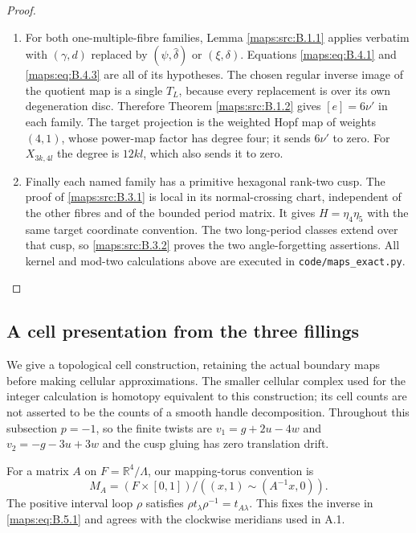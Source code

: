 \begin{proof}
\begin{enumerate}[label=\arabic*.,leftmargin=*]
\item For both one-multiple-fibre families,
Lemma \ref{maps:src:B.1.1} applies verbatim with
$(\gamma,d)$ replaced by $(\psi,\widehat\delta)$
or $(\xi,\delta)$.  Equations \eqref{maps:eq:B.4.1}
and \eqref{maps:eq:B.4.3} are all of its hypotheses.
The chosen regular inverse image of
the quotient map is a single $T_L$,
because every replacement is over its
own degeneration disc.  Therefore
Theorem \ref{maps:src:B.1.2} gives $[e]=6\nu'$ in
each family.  The target projection
is the weighted Hopf map of weights
$(4,1)$, whose power-map factor has
degree four; it sends $6\nu'$ to zero.
For $X_{3k,4l}$ the degree is $12kl$,
which also sends it to zero.

\item Finally each named family has a
primitive hexagonal rank-two cusp.
The proof of \ref{maps:src:B.3.1} is local in its
normal-crossing chart, independent
of the other fibres and of the
bounded period matrix.  It gives
$H=\eta_4\eta_5$ with the same target
coordinate convention.  The two
long-period classes extend over
that cusp, so \ref{maps:src:B.3.2} proves the
two angle-forgetting assertions.
All kernel and mod-two calculations
above are executed in
\texttt{code/maps\_exact.py}.
\end{enumerate}
\end{proof}

\subsection{A cell presentation from the three fillings}

We give a topological cell construction, retaining the actual
boundary maps before making cellular approximations.  The
smaller cellular complex used for the integer calculation is
homotopy equivalent to this construction; its cell counts are
not asserted to be the counts of a smooth handle decomposition.
Throughout this subsection $p=-1$, so the finite twists are
$v_1=g+2u-4w$ and $v_2=-g-3u+3w$ and the cusp gluing has
zero translation drift.

For a matrix $A$ on $F=\mathbb R^4/\Lambda$, our mapping-torus
convention is
\[
 M_A=(F\times[0,1])/((x,1)\sim(A^{-1}x,0)).
 \tag{B.5.1}\label{maps:eq:B.5.1}
\]
The positive interval loop $\rho$ satisfies
$\rho t_\lambda\rho^{-1}=t_{A\lambda}$.  This fixes the
inverse in \eqref{maps:eq:B.5.1} and agrees with the clockwise meridians
used in A.1.

